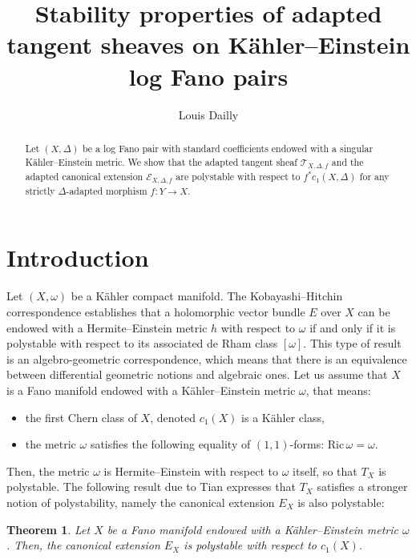 \documentclass[12pt,a4paper]{amsart}
\title[Stability of adapted tangent sheaves on KE log Fano pairs]{Stability properties of adapted tangent sheaves on K\"ahler--Einstein log Fano pairs}
\author{Louis Dailly}
\newcommand{\Ric}{\mathrm{Ric}\,}
\theoremstyle{plain}
\newtheorem{theo}{Theorem}[section]
\theoremstyle{definition}
\begin{document}
\begin{abstract}
Let $(X, \Delta)$ be a log Fano pair with standard coefficients endowed with a singular K\"ahler--Einstein metric. We show that the adapted tangent sheaf $\mathcal{T}_{X, \Delta, f}$ and the adapted canonical extension $\mathcal{E}_{X, \Delta, f}$ are polystable with respect to $f^*c_1(X, \Delta)$ for any strictly $\Delta$-adapted morphism $f : Y \to X$.
\end{abstract}

\maketitle

\tableofcontents

\section{Introduction}

Let $(X, \omega)$ be a K\"ahler compact manifold. The Kobayashi--Hitchin correspondence establishes that a holomorphic vector bundle $E$ over $X$ can be endowed with a Hermite--Einstein metric $h$ with respect to $\omega$ if and only if it is polystable with respect to its associated de Rham class $\left[ \omega \right]$. This type of result is an algebro-geometric correspondence, which means that there is an equivalence between differential geometric notions and algebraic ones.
Let us assume that $X$ is a Fano manifold endowed with a K\"ahler--Einstein metric $\omega$, that means:
\begin{itemize}
	\item the first Chern class of $X$, denoted $c_1(X)$ is a K\"ahler class,
	\item the metric $\omega$ satisfies the following equality of $(1,1)$-forms: $\Ric \omega = \omega$.
\end{itemize}

Then, the metric $\omega$ is Hermite--Einstein with respect to $\omega$ itself, so that $T_X$ is polystable. The following result due to Tian expresses that $T_X$ satisfies a stronger notion of polystability, namely the canonical extension $E_X$ is also polystable:

\begin{theo}\textup{\cite[Thm.~0.1]{Tia92}}
	Let $X$ be a Fano manifold endowed with a K\"ahler--Einstein metric $\omega$. Then, the canonical extension $E_X$ is polystable with respect to $c_1(X)$.	
\end{theo}
\end{document}
